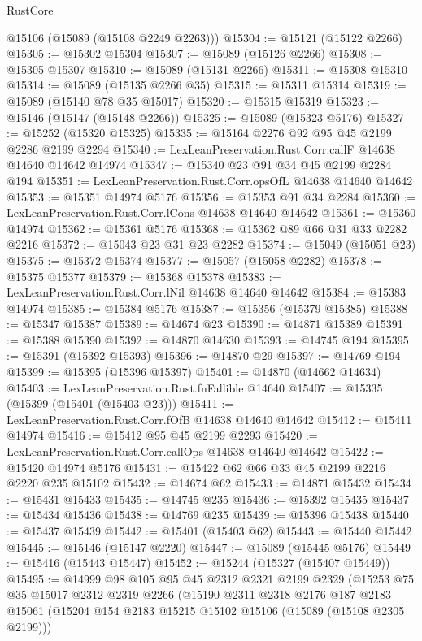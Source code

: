 \begin{lexlean}{RustCore}
\begin{coremodule}
      @15106
      (@15089 (@15108 @2249 @2263)))
@15304 := @15121 (@15122 @2266)
@15305 := @15302 @15304
@15307 := @15089 (@15126 @2266)
@15308 := @15305 @15307
@15310 := @15089 (@15131 @2266)
@15311 := @15308 @15310
@15314 := @15089 (@15135 @2266 @35)
@15315 := @15311 @15314
@15319 := @15089 (@15140 @78 @35 @15017)
@15320 := @15315 @15319
@15323 := @15146 (@15147 (@15148 @2266))
@15325 := @15089 (@15323 @5176)
@15327 := @15252 (@15320 @15325)
@15335 := @15164 @2276 @92 @95 @45 @2199 @2286 @2199 @2294
@15340 := LexLeanPreservation.Rust.Corr.callF @14638 @14640 @14642 @14974
@15347 := @15340 @23 @91 @34 @45 @2199 @2284 @194
@15351 := LexLeanPreservation.Rust.Corr.opsOfL @14638 @14640 @14642
@15353 := @15351 @14974 @5176
@15356 := @15353 @91 @34 @2284
@15360 := LexLeanPreservation.Rust.Corr.lCons @14638 @14640 @14642
@15361 := @15360 @14974
@15362 := @15361 @5176
@15368 := @15362 @89 @66 @31 @33 @2282 @2216
@15372 := @15043 @23 @31 @23 @2282
@15374 := @15049 (@15051 @23)
@15375 := @15372 @15374
@15377 := @15057 (@15058 @2282)
@15378 := @15375 @15377
@15379 := @15368 @15378
@15383 := LexLeanPreservation.Rust.Corr.lNil @14638 @14640 @14642
@15384 := @15383 @14974
@15385 := @15384 @5176
@15387 := @15356 (@15379 @15385)
@15388 := @15347 @15387
@15389 := @14674 @23
@15390 := @14871 @15389
@15391 := @15388 @15390
@15392 := @14870 @14630
@15393 := @14745 @194
@15395 := @15391 (@15392 @15393)
@15396 := @14870 @29
@15397 := @14769 @194
@15399 := @15395 (@15396 @15397)
@15401 := @14870 (@14662 @14634)
@15403 := LexLeanPreservation.Rust.fnFallible @14640
@15407 := @15335 (@15399 (@15401 (@15403 @23)))
@15411 := LexLeanPreservation.Rust.Corr.fOfB @14638 @14640 @14642
@15412 := @15411 @14974
@15416 := @15412 @95 @45 @2199 @2293
@15420 := LexLeanPreservation.Rust.Corr.callOps @14638 @14640 @14642
@15422 := @15420 @14974 @5176
@15431 := @15422 @62 @66 @33 @45 @2199 @2216 @2220 @235 @15102
@15432 := @14674 @62
@15433 := @14871 @15432
@15434 := @15431 @15433
@15435 := @14745 @235
@15436 := @15392 @15435
@15437 := @15434 @15436
@15438 := @14769 @235
@15439 := @15396 @15438
@15440 := @15437 @15439
@15442 := @15401 (@15403 @62)
@15443 := @15440 @15442
@15445 := @15146 (@15147 @2220)
@15447 := @15089 (@15445 @5176)
@15449 := @15416 (@15443 @15447)
@15452 := @15244 (@15327 (@15407 @15449))
@15495 := @14999
    @98
    @105
    @95
    @45
    @2312
    @2321
    @2199
    @2329
    (@15253
      @75
      @35
      @15017
      @2312
      @2319
      @2266
      (@15190
        @2311
        @2318
        @2176
        @187
        @2183
        @15061
        (@15204 @154 @2183 @15215 @15102 @15106 (@15089 (@15108 @2305 @2199)))

\end{coremodule}
\end{lexlean}
